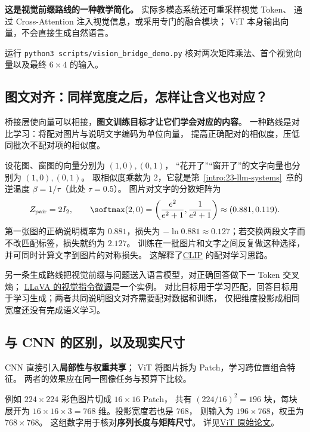 

\begin{boundarybox}
\textbf{这是视觉前缀路线的一种教学简化。}
实际多模态系统还可重采样视觉 Token、
通过 Cross-Attention 注入视觉信息，或采用专门的融合模块；
ViT 本身输出向量，不会直接生成自然语言。
\end{boundarybox}

运行 \texttt{python3 scripts/vision\_bridge\_demo.py}
核对两次矩阵乘法、首个视觉向量以及最终 $6\times4$ 的输入。

\subsection{图文对齐：同样宽度之后，怎样让含义也对应？}
\label{concept:vision-language-alignment}

桥接层使向量可以相接，\textbf{图文训练目标才让它们学会对应的内容}。
一种路线是对比学习：将配对图片与说明文字编码为单位向量，
提高正确配对的相似度，压低同批次不配对项的相似度。

设花图、窗图的向量分别为 $(1,0),(0,1)$，
“花开了”“窗开了”的文字向量也分别为 $(1,0),(0,1)$。
取相似度乘数为 2，它就是第~\ref*{intro:23-llm-systems}~章的逆温度 $\beta=1/\tau$（此处 $\tau=0.5$）。
图片对文字的分数矩阵为
\[
Z_{\rm pair}=2I_2,\qquad
\softmax(2,0)=\left(\frac{e^2}{e^2+1},\frac1{e^2+1}\right)
\approx(0.881,0.119).
\]
第一张图的正确说明概率为 $0.881$，损失为
$-\ln0.881\approx0.127$；若交换两段文字而不改匹配标签，损失就约为 $2.127$。
训练在一批图片和文字之间反复做这种选择，并可同时计算文字到图片的对称损失。
\label{concept:clip}这解释了\href{https://arxiv.org/abs/2103.00020}{CLIP} 的配对学习思路。

另一条生成路线把视觉前缀与问题送入语言模型，对正确回答做下一 Token 交叉熵；
\href{https://arxiv.org/abs/2304.08485}{LLaVA 的视觉指令微调}是一个实例。
对比目标用于学习匹配，回答目标用于学习生成；两者共同说明图文对齐需要配对数据和训练，
仅把维度投影成相同宽度还没有完成语义学习。

\subsection{与 CNN 的区别，以及现实尺寸}

CNN 直接引入\textbf{局部性与权重共享}；
ViT 将图片拆为 Patch，学习跨位置组合特征。
两者的效果应在同一图像任务与预算下比较。

例如 $224\times224$ 彩色图片切成 $16\times16$ Patch，
共有 $(224/16)^2=196$ 块，每块展开为
$16\times16\times3=768$ 维。投影宽度若也是 $768$，
则输入为 $196\times768$，权重为 $768\times768$。
这组数字用于核对\textbf{序列长度与矩阵尺寸}。
详见\href{https://arxiv.org/abs/2010.11929}{ViT 原始论文}。


